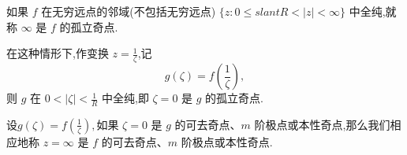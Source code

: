 \documentclass[../../main.tex]{subfiles}
\begin{document}
\begin{definition}
如果 \( f \) 在无穷远点的邻域(不包括无穷远点) \( \{ z: 0 \leqslant slant R < |z| < \infty \} \) 中全纯,就称 \( \infty \) 是 \( f \) 的孤立奇点.
\end{definition}
\begin{remark}
在这种情形下,作变换 \( z = \frac{1}{\zeta} \),记
\[
g(\zeta) = f\left( \frac{1}{\zeta} \right),
\]
则 \( g \) 在 \( 0 < |\zeta| < \frac{1}{R} \) 中全纯,即 \( \zeta = 0 \) 是 \( g \) 的孤立奇点.
\end{remark}

\begin{definition}
设$g(\zeta) = f\left( \frac{1}{\zeta} \right),$如果 \( \zeta = 0 \) 是 \( g \) 的可去奇点、\( m \) 阶极点或本性奇点,那么我们相应地称 \( z = \infty \) 是 \( f \) 的可去奇点、\( m \) 阶极点或本性奇点.
\end{definition}
\end{document}
